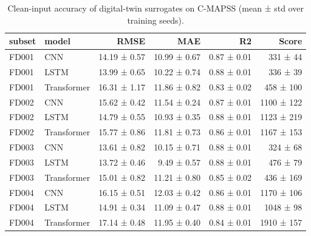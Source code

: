 \begin{table}
\caption{Clean-input accuracy of digital-twin surrogates on C-MAPSS (mean ± std over training seeds).}
\label{tab:base_acc}
\begin{tabular}{llrrrr}
\toprule  %
subset & model & RMSE & MAE & R2 & Score \\
\midrule
FD001 & CNN & 14.19 ± 0.57 & 10.99 ± 0.67 & 0.87 ± 0.01 & 331 ± 44 \\
FD001 & LSTM & 13.99 ± 0.65 & 10.22 ± 0.74 & 0.88 ± 0.01 & 336 ± 39 \\
FD001 & Transformer & 16.31 ± 1.17 & 11.86 ± 0.82 & 0.83 ± 0.02 & 458 ± 100 \\
FD002 & CNN & 15.62 ± 0.42 & 11.54 ± 0.24 & 0.87 ± 0.01 & 1100 ± 122 \\
FD002 & LSTM & 14.79 ± 0.55 & 10.93 ± 0.35 & 0.88 ± 0.01 & 1123 ± 219 \\
FD002 & Transformer & 15.77 ± 0.86 & 11.81 ± 0.73 & 0.86 ± 0.01 & 1167 ± 153 \\
FD003 & CNN & 13.61 ± 0.82 & 10.15 ± 0.71 & 0.88 ± 0.01 & 324 ± 68 \\
FD003 & LSTM & 13.72 ± 0.46 & 9.49 ± 0.57 & 0.88 ± 0.01 & 476 ± 79 \\
FD003 & Transformer & 15.01 ± 0.82 & 11.21 ± 0.80 & 0.85 ± 0.02 & 436 ± 169 \\
FD004 & CNN & 16.15 ± 0.51 & 12.03 ± 0.42 & 0.86 ± 0.01 & 1170 ± 106 \\
FD004 & LSTM & 14.91 ± 0.34 & 11.09 ± 0.47 & 0.88 ± 0.01 & 1048 ± 98 \\
FD004 & Transformer & 17.14 ± 0.48 & 11.95 ± 0.40 & 0.84 ± 0.01 & 1910 ± 157 \\
\bottomrule
\end{tabular}
\end{table}
